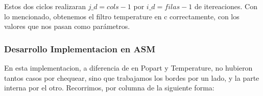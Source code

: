 Estos dos ciclos realizaran $j\_d = cols - 1$  por $i\_d = filas -1$ de itereaciones.\newline
Con lo mencionado, obtenemos el filtro temperature en c correctamente, con los valores que nos pasan como parámetros.\newline

\vspace*{0.3cm} \noindent
\subsubsection{Desarrollo Implementacion en ASM}
En esta implementacion, a diferencia de en Popart y Temperature, no hubieron tantos casos por chequear, sino que trabajamos 
los bordes por un lado, y la parte interna por el otro. \newline
Recorrimos, por columna de la siguiente forma: \newline

